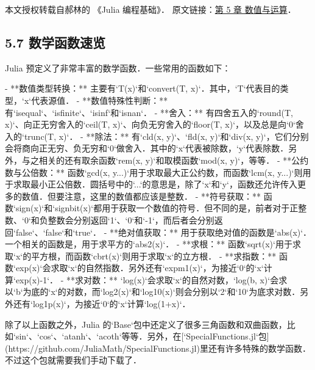 
本文授权转载自郝林的 《Julia 编程基础》． 原文链接：\href{https://github.com/hyper0x/JuliaBasics/blob/master/book/ch05.md}{第 5 章 数值与运算}．


\subsection{5.7 数学函数速览}

Julia 预定义了非常丰富的数学函数．一些常用的函数如下：

- **数值类型转换：** 主要有`T(x)`和`convert(T, x)`．其中，`T`代表目的类型，`x`代表源值．
- **数值特殊性判断：** 有`isequal`、`isfinite`、`isinf`和`isnan`．
- **舍入：** 有四舍五入的`round(T, x)`、向正无穷舍入的`ceil(T, x)`、向负无穷舍入的`floor(T, x)`，以及总是向`0`舍入的`trunc(T, x)`．
- **除法：** 有`cld(x, y)`、`fld(x, y)`和`div(x, y)`，它们分别会将商向正无穷、负无穷和`0`做舍入．其中的`x`代表被除数，`y`代表除数．另外，与之相关的还有取余函数`rem(x, y)`和取模函数`mod(x, y)`，等等．
- **公约数与公倍数：** 函数`gcd(x, y...)`用于求取最大正公约数，而函数`lcm(x, y...)`则用于求取最小正公倍数．圆括号中的`...`的意思是，除了`x`和`y`，函数还允许传入更多的数值．但要注意，这里的数值都应该是整数．
- **符号获取：** 函数`sign(x)`和`signbit(x)`都用于获取一个数值的符号．但不同的是，前者对于正整数、`0`和负整数会分别返回`1`、`0`和`-1`，而后者会分别返回`false`、`false`和`true`．
- **绝对值获取：** 用于获取绝对值的函数是`abs(x)`．一个相关的函数是，用于求平方的`abs2(x)`．
- **求根：** 函数`sqrt(x)`用于求取`x`的平方根，而函数`cbrt(x)`则用于求取`x`的立方根．
- **求指数：** 函数`exp(x)`会求取`x`的自然指数．另外还有`expm1(x)`，为接近`0`的`x`计算`exp(x)-1`．
- **求对数：** `log(x)`会求取`x`的自然对数，`log(b, x)`会求以`b`为底的`x`的对数，而`log2(x)`和`log10(x)`则会分别以`2`和`10`为底求对数．另外还有`log1p(x)`，为接近`0`的`x`计算`log(1+x)`．

除了以上函数之外，Julia 的`Base`包中还定义了很多三角函数和双曲函数，比如`sin`、`cos`、`atanh`、`acoth`等等．另外，在[`SpecialFunctions.jl`包](https://github.com/JuliaMath/SpecialFunctions.jl)里还有许多特殊的数学函数．不过这个包就需要我们手动下载了．